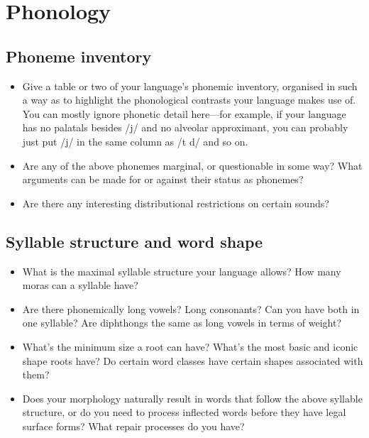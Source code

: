 \documentclass{article}
\begin{document}
\section{Phonology}

\subsection{Phoneme inventory}
\begin{itemize}
  \item Give a table or two of your language's phonemic inventory, organised in such a way as to highlight the phonological contrasts your language makes use of. You can mostly ignore phonetic detail here---for example, if your language has no palatals besides /j/ and no alveolar approximant, you can probably just put /j/ in the same column as /t d/ and so on.
  \item Are any of the above phonemes marginal, or questionable in some way? What arguments can be made for or against their status as phonemes?
  \item Are there any interesting distributional restrictions on certain sounds?
\end{itemize}

\subsection{Syllable structure and word shape}
\begin{itemize}
  \item What is the maximal syllable structure your language allows? How many moras can a syllable have?
  \item Are there phonemically long vowels? Long consonants? Can you have both in one syllable? Are diphthongs the same as long vowels in terms of weight?
  \item What's the minimum size a root can have? What's the most basic and iconic shape roots have? Do certain word classes have certain shapes associated with them?
  \item Does your morphology naturally result in words that follow the above syllable structure, or do you need to process inflected words before they have legal surface forms? What repair processes do you have?
\end{itemize}
\end{document}
